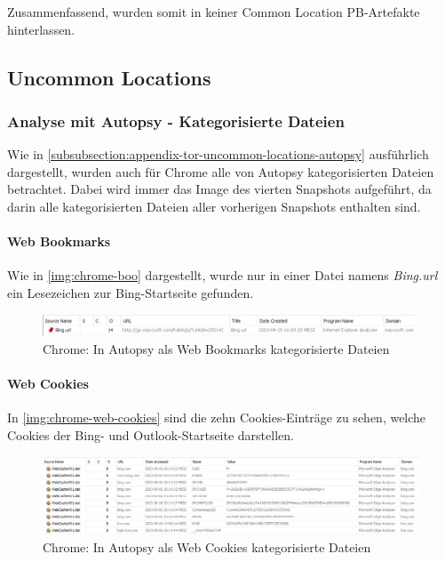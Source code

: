 \begin{appendices}
Zusammenfassend, wurden somit in keiner Common Location PB-Artefakte hinterlassen.

\subsection{Uncommon Locations}\label{chap:anhang-chrome-uncommon}
\subsubsection*{Analyse mit Autopsy - Kategorisierte Dateien}\label{chap:anhang-chrome-uncommon-autopsy}

Wie in \autoref{subsubsection:appendix-tor-uncommon-locations-autopsy} ausführlich dargestellt, wurden auch für Chrome alle von Autopsy kategorisierten Dateien betrachtet. Dabei wird immer das Image des vierten Snapshots aufgeführt, da darin alle kategorisierten Dateien aller vorherigen Snapshots enthalten sind.

\paragraph{Web Bookmarks}\label{chap:anhang-chrome-uncommon-autopsy-web-bookmarks}
Wie in \autoref{img:chrome-boo} dargestellt, wurde nur in einer Datei namens \textit{Bing.url} ein Lesezeichen zur Bing-Startseite gefunden.

\begin{figure}[ht]
	\centering
	\includegraphics[width=\textwidth]{bilder/CHBoo.png}
	\caption{Chrome: In Autopsy als \glqq{}Web Bookmarks\grqq{} kategorisierte Dateien}
	\label{img:chrome-boo}
\end{figure}

\paragraph*{Web Cookies}\label{chap:anhang-chrome-uncommon-autopsy-web-cookies}
In \autoref{img:chrome-web-cookies} sind die zehn Cookies-Einträge zu sehen, welche Cookies der Bing- und Outlook-Startseite darstellen. 

\begin{figure}[ht]
	\centering
	\includegraphics[width=\textwidth]{bilder/CHCoo.png}
	\caption{Chrome: In Autopsy als \glqq{}Web Cookies\grqq{} kategorisierte Dateien}
	\label{img:chrome-web-cookies}  
\end{figure}


\end{appendices}
